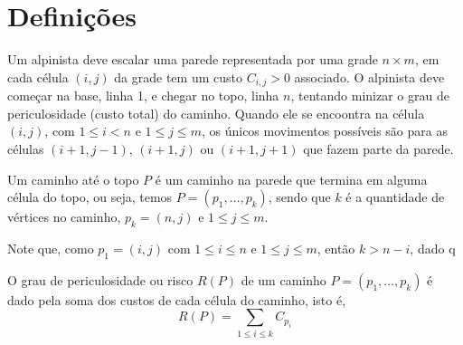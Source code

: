 \section{Definições}

Um alpinista deve escalar uma parede representada por uma grade $n \times m$, em cada célula $(i, j)$ da grade tem um custo $C_{i, j} > 0$ associado. O alpinista deve começar na base, linha 1, e chegar no topo, linha $n$, tentando minizar o grau de periculosidade (custo total) do caminho. Quando ele se encoontra na célula $(i, j)$, com $1 \leq i < n$ e $1 \leq j \leq m$, os únicos movimentos possíveis são para as células $(i+1, j-1)$, $(i+1, j)$ ou $(i+1, j+1)$ que fazem parte da parede.

\begin{definition}
    Um caminho até o topo $P$ é um caminho na parede que termina em alguma célula do topo, ou seja, temos $P = \left(p_1, \ldots, p_k\right)$, sendo que $k$ é a quantidade de vértices no caminho, $p_k = (n, j)$ e $1 \leq j \leq m$.

    Note que, como $p_1 = (i, j)$ com $1 \leq i \leq n$ e $1 \leq j \leq m$, então $k > n - i$, dado q
\end{definition}

\begin{definition}[Risco]
    O grau de periculosidade ou risco $R(P)$ de um caminho $P = \left(p_1, \ldots, p_k\right)$ é dado pela soma dos custos de cada célula do caminho, isto é,
    \[
        R(P) = \sum_{1 \leq i \leq k} C_{p_i}
    \]
\end{definition}

